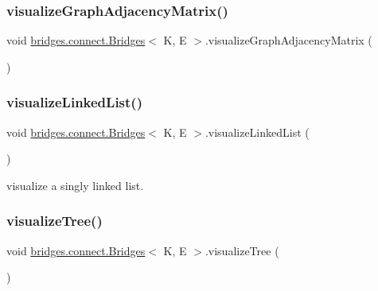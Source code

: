 \subsubsection{\texorpdfstring{visualize\+Graph\+Adjacency\+Matrix()}{visualizeGraphAdjacencyMatrix()}}
{\footnotesize\ttfamily void \hyperlink{classbridges_1_1connect_1_1_bridges}{bridges.\+connect.\+Bridges}$<$ K, E $>$.visualize\+Graph\+Adjacency\+Matrix (\begin{DoxyParamCaption}{ }\end{DoxyParamCaption})\hspace{0.3cm}{\ttfamily [protected]}}

\hypertarget{classbridges_1_1connect_1_1_bridges_ae9ce2673d2eef1da7f6e1359c494f6fe}{}\label{classbridges_1_1connect_1_1_bridges_ae9ce2673d2eef1da7f6e1359c494f6fe} 
\subsubsection{\texorpdfstring{visualize\+Linked\+List()}{visualizeLinkedList()}}
{\footnotesize\ttfamily void \hyperlink{classbridges_1_1connect_1_1_bridges}{bridges.\+connect.\+Bridges}$<$ K, E $>$.visualize\+Linked\+List (\begin{DoxyParamCaption}{ }\end{DoxyParamCaption})\hspace{0.3cm}{\ttfamily [protected]}}

visualize a singly linked list. \hypertarget{classbridges_1_1connect_1_1_bridges_abd8fa1ef8d6c5d3e6c533ee069d24d85}{}\label{classbridges_1_1connect_1_1_bridges_abd8fa1ef8d6c5d3e6c533ee069d24d85} 
\subsubsection{\texorpdfstring{visualize\+Tree()}{visualizeTree()}}
{\footnotesize\ttfamily void \hyperlink{classbridges_1_1connect_1_1_bridges}{bridges.\+connect.\+Bridges}$<$ K, E $>$.visualize\+Tree (\begin{DoxyParamCaption}{ }\end{DoxyParamCaption})\hspace{0.3cm}{\ttfamily [protected]}}

